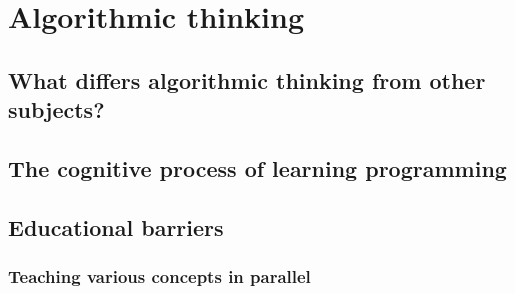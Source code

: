 \chapter{Algorithmic thinking}

\section{What differs algorithmic thinking from other subjects?}

\section{The cognitive process of learning programming}

\section{Educational barriers}
\subsection{Teaching various concepts in parallel}